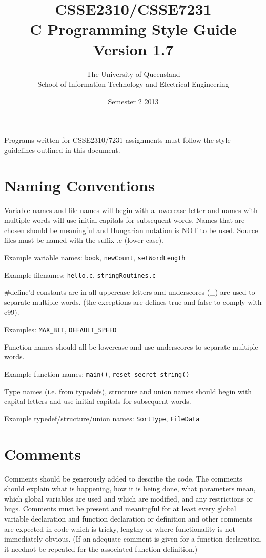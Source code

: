 \documentclass{article}
\title{CSSE2310/CSSE7231\\C Programming Style Guide\\Version 1.7}
\author{The University of Queensland\\School of Information Technology and Electrical Engineering}
\date{Semester 2 2013}
\begin{document}
\maketitle

Programs written for CSSE2310/7231 assignments must follow the style guidelines outlined in this document.


\section{Naming Conventions}
Variable names and file names will begin with a lowercase letter and names with multiple words will use initial capitals for subsequent words.
Names that are chosen should be meaningful and Hungarian notation is NOT to be used.
Source files must be named with the suffix .c (lower case).

Example variable names: \texttt{book}, \texttt{newCount}, \texttt{setWordLength}

Example filenames: \texttt{hello.c}, \texttt{stringRoutines.c}

\bigskip
\#define’d constants are in all uppercase letters and underscores (\_) are used to separate multiple words.
(the exceptions are defines true and false to comply with c99).

Examples: \texttt{MAX\_BIT}, \texttt{DEFAULT\_SPEED}

\bigskip
Function names should all be lowercase and use underscores to separate multiple words.

Example function names: \texttt{main()}, \texttt{reset\_secret\_string()}

\bigskip
Type names (i.e. from typedefs), structure and union names should begin with capital letters and use initial capitals for subsequent words.

Example typedef/structure/union names: \texttt{SortType}, \texttt{FileData}


\section{Comments}
Comments should be generously added to describe the code.
The comments should explain what is happening, how it is being done, what parameters mean, which global variables are used and which are modified, and any restrictions or bugs.
Comments must be present and meaningful for at least every global variable declaration and function declaration or definition and other comments are expected in code which is tricky, lengthy or where functionality is not immediately obvious.
(If an adequate comment is given for a function declaration, it neednot be repeated for the associated function definition.)
\end{document}

